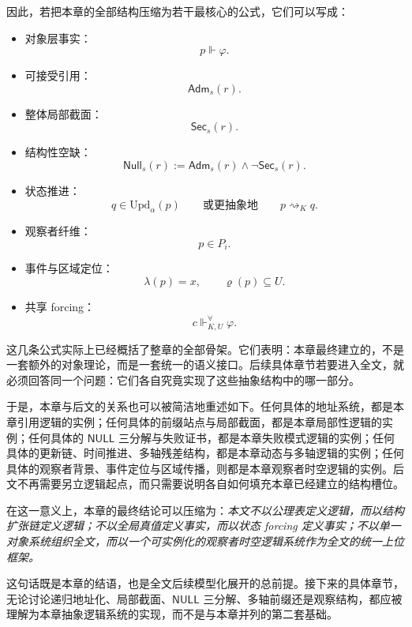 因此，若把本章的全部结构压缩为若干最核心的公式，它们可以写成：
\begin{itemize}
  \item 对象层事实：
  \[
  p\Vdash \varphi.
  \]
  \item 可接受引用：
  \[
  \mathsf{Adm}_s(r).
  \]
  \item 整体局部截面：
  \[
  \mathsf{Sec}_s(r).
  \]
  \item 结构性空缺：
  \[
  \mathsf{Null}_s(r)
  :=
  \mathsf{Adm}_s(r)\land \neg \mathsf{Sec}_s(r).
  \]
  \item 状态推进：
  \[
  q\in \mathrm{Upd}_\alpha(p)
  \qquad\text{或更抽象地}\qquad
  p\rightsquigarrow_K q.
  \]
  \item 观察者纤维：
  \[
  p\in P_i.
  \]
  \item 事件与区域定位：
  \[
  \lambda(p)=x,
  \qquad
  \varrho(p)\subseteq U.
  \]
  \item 共享 forcing：
  \[
  c\Vdash^{\forall}_{K,U}\varphi.
  \]
\end{itemize}

这几条公式实际上已经概括了整章的全部骨架。它们表明：本章最终建立的，不是一套额外的对象理论，而是一套统一的语义接口。后续具体章节若要进入全文，就必须回答同一个问题：它们各自究竟实现了这些抽象结构中的哪一部分。

于是，本章与后文的关系也可以被简洁地重述如下。任何具体的地址系统，都是本章引用逻辑的实例；任何具体的前缀站点与局部截面，都是本章局部性逻辑的实例；任何具体的 \(\mathsf{NULL}\) 三分解与失败证书，都是本章失败模式逻辑的实例；任何具体的更新链、时间推进、多轴残差结构，都是本章动态与多轴逻辑的实例；任何具体的观察者背景、事件定位与区域传播，则都是本章观察者时空逻辑的实例。后文不再需要另立逻辑起点，而只需要说明各自如何填充本章已经建立的结构槽位。

在这一意义上，本章的最终结论可以压缩为：\emph{本文不以公理表定义逻辑，而以结构扩张链定义逻辑；不以全局真值定义事实，而以状态 forcing 定义事实；不以单一对象系统组织全文，而以一个可实例化的观察者时空逻辑系统作为全文的统一上位框架。}

这句话既是本章的结语，也是全文后续模型化展开的总前提。接下来的具体章节，无论讨论递归地址化、局部截面、\(\mathsf{NULL}\) 三分解、多轴前缀还是观察结构，都应被理解为本章抽象逻辑系统的实现，而不是与本章并列的第二套基础。
